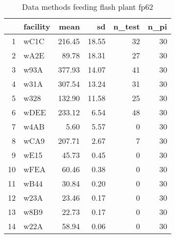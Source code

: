 \begin{table}[H]
\centering
\begin{tabular}{rlrrrr}
  \hline
 & facility & mean & sd & n\_test & n\_pi \\ 
  \hline
1 & wC1C & 216.45 & 18.55 &  32 &  30 \\ 
  2 & wA2E & 89.78 & 18.31 &  27 &  30 \\ 
  3 & w93A & 377.93 & 14.07 &  41 &  30 \\ 
  4 & w31A & 307.54 & 13.24 &  31 &  30 \\ 
  5 & w328 & 132.90 & 11.58 &  25 &  30 \\ 
  6 & wDEE & 233.12 & 6.54 &  48 &  30 \\ 
  7 & w4AB & 5.60 & 5.57 &   0 &  30 \\ 
  8 & wCA9 & 207.71 & 2.67 &   7 &  30 \\ 
  9 & wE15 & 45.73 & 0.45 &   0 &  30 \\ 
  10 & wFEA & 60.46 & 0.38 &   0 &  30 \\ 
  11 & wB44 & 30.84 & 0.20 &   0 &  30 \\ 
  12 & w23A & 23.46 & 0.17 &   0 &  30 \\ 
  13 & w8B9 & 22.73 & 0.17 &   0 &  30 \\ 
  14 & w22A & 58.94 & 0.06 &   0 &  30 \\ 
   \hline
\end{tabular}
\caption{Data methods feeding flash plant fp62} 
\label{tab:well_summaries_fp15}
\end{table}
